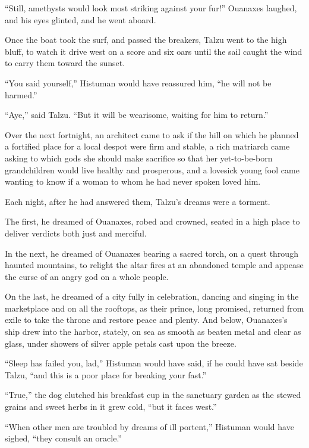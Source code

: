 ``Still, amethysts would look most striking against your fur!'' Ouanaxes laughed, and his eyes glinted, and he went aboard.

Once the boat took the surf, and passed the breakers, Talzu went to the high bluff, to watch it drive west on a score and six oars until the sail caught the wind to carry them toward the sunset.

``You said yourself,'' Histuman would have reassured him, ``he will not be harmed.''

``Aye,'' said Talzu. ``But it will be wearisome, waiting for him to return.''

\secdiv

\noindent Over the next fortnight, an architect came to ask if the hill on which he planned a fortified place for a local despot were firm and stable, a rich matriarch came asking to which gods she should make sacrifice so that her yet-to-be-born grandchildren would live healthy and prosperous, and a lovesick young fool came wanting to know if a woman to whom he had never spoken loved him.

Each night, after he had answered them, Talzu's dreams were a torment.

The first, he dreamed of Ouanaxes, robed and crowned, seated in a high place to deliver verdicts both just and merciful.

In the next, he dreamed of Ouanaxes bearing a sacred torch, on a quest through haunted mountains, to relight the altar fires at an abandoned temple and appease the curse of an angry god on a whole people.

On the last, he dreamed of a city fully in celebration, dancing and singing in the marketplace and on all the rooftops, as their prince, long promised, returned from exile to take the throne and restore peace and plenty. And below, Ouanaxes's ship drew into the harbor, stately, on sea as smooth as beaten metal and clear as glass, under showers of silver apple petals cast upon the breeze.

``Sleep has failed you, lad,'' Histuman would have said, if he could have sat beside Talzu, ``and this is a poor place for breaking your fast.''

``True,'' the dog clutched his breakfast cup in the sanctuary garden as the stewed grains and sweet herbs in it grew cold, ``but it faces west.''

``When other men are troubled by dreams of ill portent,'' Histuman would have sighed, ``they consult an oracle.''

